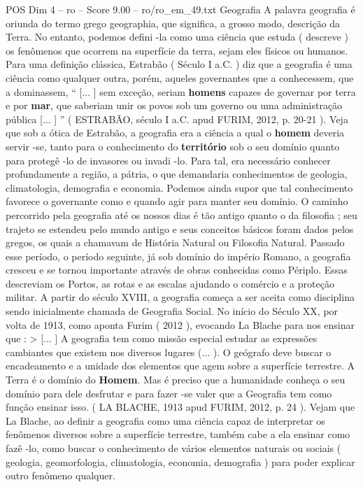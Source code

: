 \begin{textsample}{POS Dim 4 – ro – Score 9.00 – ro/ro\_em\_49.txt}  \label{ex:f4_pos_220}
Geografia A palavra geografia é oriunda do termo grego geographia, que significa, a grosso modo, descrição da Terra.
No entanto, podemos defini -la como uma ciência que estuda ( descreve ) os fenômenos que ocorrem na superfície da terra, sejam eles físicos ou humanos.
Para uma definição clássica, Estrabão ( Século I a.C. ) diz que a geografia é uma ciência como qualquer outra, porém, aqueles governantes que a conhecessem, que a dominassem, “ [... ] sem exceção, seriam \textbf{homens} capazes de governar por terra e por \textbf{mar}, que saberiam unir os povos sob um governo ou uma administração pública [... ] ” ( ESTRABÃO, século I a.C. apud FURIM, 2012, p. 20-21 ).
Veja que sob a ótica de Estrabão, a geografia era a ciência a qual o \textbf{homem} deveria servir -se, tanto para o conhecimento do \textbf{território} sob o seu domínio quanto para protegê -lo de invasores ou invadi -lo.
Para tal, era necessário conhecer profundamente a região, a pátria, o que demandaria conhecimentos de geologia, climatologia, demografia e economia.
Podemos ainda supor que tal conhecimento favorece o governante como e quando agir para manter seu domínio.
O caminho percorrido pela geografia até os nossos dias é tão antigo quanto o da filosofia ; seu trajeto se estendeu pelo mundo antigo e seus conceitos básicos foram dados pelos gregos, os quais a chamavam de História Natural ou Filosofia Natural.
Passado esse período, o período seguinte, já sob domínio do império Romano, a geografia cresceu e se tornou importante através de obras conhecidas como Périplo.
Essas descreviam os Portos, as rotas e as escalas ajudando o comércio e a proteção militar.
A partir do século XVIII, a geografia começa a ser aceita como disciplina sendo inicialmente chamada de Geografia Social.
No início do Século XX, por volta de 1913, como aponta Furim ( 2012 ), evocando La Blache para nos ensinar que : > [... ] A geografia tem como missão especial estudar as expressões cambiantes que existem nos diversos lugares (... ).
O geógrafo deve buscar o encadeamento e a unidade dos elementos que agem sobre a superfície terrestre.
A Terra é o domínio do \textbf{Homem}.
Mas é preciso que a humanidade conheça o seu domínio para dele desfrutar e para fazer -se valer que a Geografia tem como função ensinar isso. ( LA BLACHE, 1913 apud FURIM, 2012, p. 24 ).
Vejam que La Blache, ao definir a geografia como uma ciência capaz de interpretar os fenômenos diversos sobre a superfície terrestre, também cabe a ela ensinar como fazê -lo, como buscar o conhecimento de vários elementos naturais ou sociais ( geologia, geomorfologia, climatologia, economia, demografia ) para poder explicar outro fenômeno qualquer.

\end{textsample}
